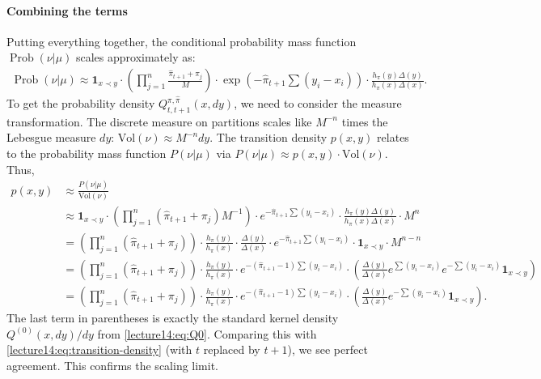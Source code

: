 \documentclass[letterpaper,11pt,oneside,reqno]{book}
\numberwithin{equation}{chapter}  %
\theoremstyle{definition}
\begin{document}
\paragraph{Combining the terms}
Putting everything together, the conditional probability mass function $\operatorname{Prob}(\nu | \mu)$ scales approximately as:
\begin{multline*}
	\operatorname{Prob}(\nu | \mu) \approx \mathbf{1}_{x \prec y} \cdot \left( \prod_{j=1}^n \frac{\widehat\pi_{t+1}+\pi_j}{M} \right) \cdot \exp\left(-\widehat\pi_{t+1} \sum (y_i - x_i)\right) \cdot \frac{h_\pi(y) \Delta(y)}{h_\pi(x) \Delta(x)}.
\end{multline*}
To get the probability density $Q_{t,t+1}^{\pi,\widehat\pi}(x, dy)$, we need to consider the measure transformation. The discrete measure on partitions scales like $M^{-n}$ times the Lebesgue measure $dy$: $\text{Vol}(\nu) \approx M^{-n} dy$.
The transition density $p(x,y)$ relates to the probability mass function $P(\nu|\mu)$ via $P(\nu|\mu) \approx p(x,y) \cdot \text{Vol}(\nu)$.
Thus,
\begin{align*}
	p(x,y) &\approx \frac{P(\nu|\mu)}{\text{Vol}(\nu)} \\
	&\approx \mathbf{1}_{x \prec y} \cdot \left( \prod_{j=1}^n (\widehat\pi_{t+1}+\pi_j) M^{-1} \right) \cdot e^{-\widehat\pi_{t+1} \sum (y_i - x_i)} \cdot \frac{h_\pi(y) \Delta(y)}{h_\pi(x) \Delta(x)} \cdot M^n \\
	&= \left( \prod_{j=1}^n (\widehat\pi_{t+1}+\pi_j) \right) \cdot \frac{h_\pi(y)}{h_\pi(x)} \cdot \frac{\Delta(y)}{\Delta(x)} \cdot e^{-\widehat\pi_{t+1} \sum (y_i - x_i)} \cdot \mathbf{1}_{x \prec y} \cdot M^{n-n} \\
	&= \left( \prod_{j=1}^n (\widehat\pi_{t+1}+\pi_j) \right) \cdot \frac{h_\pi(y)}{h_\pi(x)} \cdot e^{-(\widehat\pi_{t+1}-1) \sum (y_i - x_i)} \cdot \left( \frac{\Delta(y)}{\Delta(x)} e^{\sum (y_i - x_i)} e^{-\sum (y_i - x_i)} \mathbf{1}_{x \prec y} \right) \\
	&= \left( \prod_{j=1}^n (\widehat\pi_{t+1}+\pi_j) \right) \cdot \frac{h_\pi(y)}{h_\pi(x)} \cdot e^{-(\widehat\pi_{t+1}-1) \sum (y_i - x_i)} \cdot \left( \frac{\Delta(y)}{\Delta(x)} e^{-\sum (y_i - x_i)} \mathbf{1}_{x \prec y} \right).
\end{align*}
The last term in parentheses is exactly the standard kernel density $Q^{(0)}(x, dy)/dy$ from \eqref{lecture14:eq:Q0}. Comparing this with \eqref{lecture14:eq:transition-density} (with $t$ replaced by $t+1$), we see perfect agreement. This confirms the scaling limit.
\end{document}
